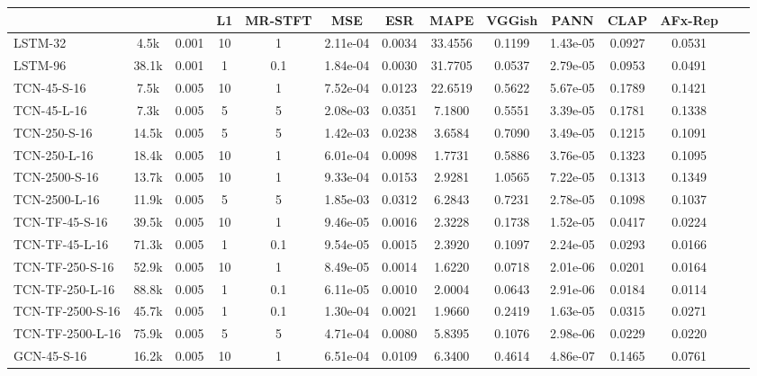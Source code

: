 \begin{table*}[h]
{\begin{tabular}{lccccccccccccc}
            &   &   & L1 & MR-STFT & MSE & ESR & MAPE & VGGish & PANN & CLAP & AFx-Rep \\ 
            \hline
            LSTM-32 & 4.5k & 0.001 & 10 & 1 & 2.11e-04 & 0.0034 & 33.4556 & 0.1199 & 1.43e-05 & 0.0927 & 0.0531 \\
            LSTM-96 & 38.1k & 0.001 & 1 & 0.1 & 1.84e-04 & 0.0030 & 31.7705 & 0.0537 & 2.79e-05 & 0.0953 & 0.0491 \\
            \hline
            TCN-45-S-16 & 7.5k & 0.005 & 10 & 1 & 7.52e-04 & 0.0123 & 22.6519 & 0.5622 & 5.67e-05 & 0.1789 & 0.1421 \\
            TCN-45-L-16 & 7.3k & 0.005 & 5 & 5 & 2.08e-03 & 0.0351 & 7.1800 & 0.5551 & 3.39e-05 & 0.1781 & 0.1338 \\
            TCN-250-S-16 & 14.5k & 0.005 & 5 & 5 & 1.42e-03 & 0.0238 & 3.6584 & 0.7090 & 3.49e-05 & 0.1215 & 0.1091 \\
            TCN-250-L-16 & 18.4k & 0.005 & 10 & 1 & 6.01e-04 & 0.0098 & 1.7731 & 0.5886 & 3.76e-05 & 0.1323 & 0.1095 \\
            TCN-2500-S-16 & 13.7k & 0.005 & 10 & 1 & 9.33e-04 & 0.0153 & 2.9281 & 1.0565 & 7.22e-05 & 0.1313 & 0.1349 \\
            TCN-2500-L-16 & 11.9k & 0.005 & 5 & 5 & 1.85e-03 & 0.0312 & 6.2843 & 0.7231 & 2.78e-05 & 0.1098 & 0.1037 \\
            \hline
            TCN-TF-45-S-16 & 39.5k & 0.005 & 10 & 1 & 9.46e-05 & 0.0016 & 2.3228 & 0.1738 & 1.52e-05 & 0.0417 & 0.0224 \\
            TCN-TF-45-L-16 & 71.3k & 0.005 & 1 & 0.1 & 9.54e-05 & 0.0015 & 2.3920 & 0.1097 & 2.24e-05 & 0.0293 & 0.0166 \\
            TCN-TF-250-S-16 & 52.9k & 0.005 & 10 & 1 & 8.49e-05 & 0.0014 & 1.6220 & 0.0718 & 2.01e-06 & 0.0201 & 0.0164 \\
            TCN-TF-250-L-16 & 88.8k & 0.005 & 1 & 0.1 & 6.11e-05 & 0.0010 & 2.0004 & 0.0643 & 2.91e-06 & 0.0184 & 0.0114 \\
            TCN-TF-2500-S-16 & 45.7k & 0.005 & 1 & 0.1 & 1.30e-04 & 0.0021 & 1.9660 & 0.2419 & 1.63e-05 & 0.0315 & 0.0271 \\
            TCN-TF-2500-L-16 & 75.9k & 0.005 & 5 & 5 & 4.71e-04 & 0.0080 & 5.8395 & 0.1076 & 2.98e-06 & 0.0229 & 0.0220 \\
            \hline
            GCN-45-S-16 & 16.2k & 0.005 & 10 & 1 & 6.51e-04 & 0.0109 & 6.3400 & 0.4614 & 4.86e-07 & 0.1465 & 0.0761 \\

\end{tabular}}
\end{table*}
